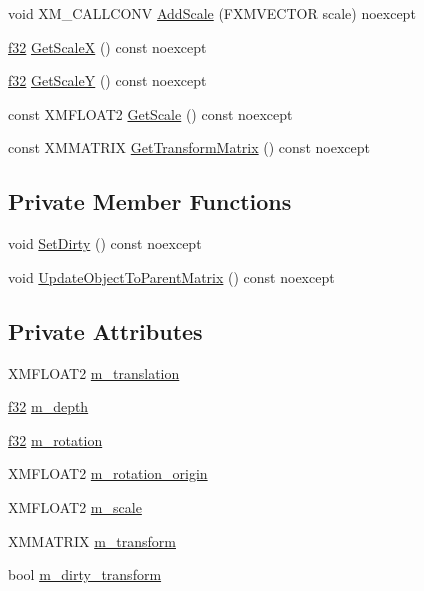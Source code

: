 \begin{DoxyCompactItemize}
\item 
void X\+M\+\_\+\+C\+A\+L\+L\+C\+O\+NV \hyperlink{structmage_1_1_sprite_transform_a9064eb670f25dbcd6937971b9ccaadda}{Add\+Scale} (F\+X\+M\+V\+E\+C\+T\+OR scale) noexcept
\item 
\hyperlink{namespacemage_a6a44ad388483959dc4dff9f2aef91431}{f32} \hyperlink{structmage_1_1_sprite_transform_aded0f45e62e48b27781181a714186482}{Get\+ScaleX} () const noexcept
\item 
\hyperlink{namespacemage_a6a44ad388483959dc4dff9f2aef91431}{f32} \hyperlink{structmage_1_1_sprite_transform_a87e7cede1b94eafcbab1e616cf072cef}{Get\+ScaleY} () const noexcept
\item 
const X\+M\+F\+L\+O\+A\+T2 \hyperlink{structmage_1_1_sprite_transform_ac62a9a5b40abbbb40398885010990e55}{Get\+Scale} () const noexcept
\item 
const X\+M\+M\+A\+T\+R\+IX \hyperlink{structmage_1_1_sprite_transform_a4e5d58a02d951c021e3e41e4ac183d0d}{Get\+Transform\+Matrix} () const noexcept
\end{DoxyCompactItemize}
\subsection*{Private Member Functions}
\begin{DoxyCompactItemize}
\item 
void \hyperlink{structmage_1_1_sprite_transform_ab76e0ca7d8f4e37a8a6f58a7a9face17}{Set\+Dirty} () const noexcept
\item 
void \hyperlink{structmage_1_1_sprite_transform_a92ae51f7dbf034d119625f70aa7fad1c}{Update\+Object\+To\+Parent\+Matrix} () const noexcept
\end{DoxyCompactItemize}
\subsection*{Private Attributes}
\begin{DoxyCompactItemize}
\item 
X\+M\+F\+L\+O\+A\+T2 \hyperlink{structmage_1_1_sprite_transform_a7642907ec8ae9685bb7c56675607045b}{m\+\_\+translation}
\item 
\hyperlink{namespacemage_a6a44ad388483959dc4dff9f2aef91431}{f32} \hyperlink{structmage_1_1_sprite_transform_a4a867b6d401866cbd50d128aa5793fa9}{m\+\_\+depth}
\item 
\hyperlink{namespacemage_a6a44ad388483959dc4dff9f2aef91431}{f32} \hyperlink{structmage_1_1_sprite_transform_a8cf752602713cc7c9d98325767cb153d}{m\+\_\+rotation}
\item 
X\+M\+F\+L\+O\+A\+T2 \hyperlink{structmage_1_1_sprite_transform_ae51ebd0226ef4b569b6a66884823bd18}{m\+\_\+rotation\+\_\+origin}
\item 
X\+M\+F\+L\+O\+A\+T2 \hyperlink{structmage_1_1_sprite_transform_a7532d4d41d02b5fa6f31eeb4fd4fd886}{m\+\_\+scale}
\item 
X\+M\+M\+A\+T\+R\+IX \hyperlink{structmage_1_1_sprite_transform_ad2fec50a82772514da9399ff31703f3d}{m\+\_\+transform}
\item 
bool \hyperlink{structmage_1_1_sprite_transform_a3072ed606f16d14d16cdad46438e9cf3}{m\+\_\+dirty\+\_\+transform}
\end{DoxyCompactItemize}
